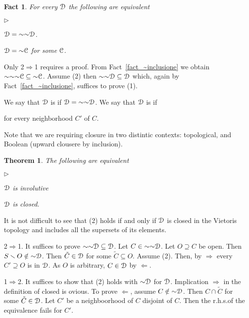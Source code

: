 \documentclass{amsproc}
\makeatletter
\newcommand{\mylabel}[1]{{#1}\hfill}
\renewenvironment{itemize}
  {\begin{list}{$\triangleright$}{%
  \setlength{\parskip}{0mm}
  \setlength{\topsep}{.1\baselineskip}
  \setlength{\rightmargin}{0mm}
  \setlength{\listparindent}{0mm}
  \setlength{\itemindent}{0mm}
  \setlength{\labelwidth}{3ex}
  \setlength{\itemsep}{.1\baselineskip}
  \setlength{\parsep}{.1\baselineskip}
  \setlength{\partopsep}{0mm}
  \setlength{\labelsep}{1ex}
  \setlength{\leftmargin}{\labelwidth+\labelsep}
  \let\makelabel\mylabel}}{%
\end{list}}
\newcounter{thm}
\theoremstyle{mio}
\newtheorem{theorem}[thm]{Theorem}\tcolorboxenvironment{theorem}{mythm}
\newtheorem{fact}[thm]{Fact}\tcolorboxenvironment{fact}{mythm}
\providecommand{\proofNameStyle}{\bfseries}
\renewenvironment{proof}[1][\proofname]{\par
  \pushQED{\qed}%
  \normalfont%
  \trivlist
  \item[\hskip\labelsep
        \proofNameStyle
    #1\@addpunct{.}]\ignorespaces
}{%
  \popQED\endtrivlist\@endpefalse
}
\renewcommand*{\emph}[1]{%
   \smash{\tikz[baseline]\node[rectangle, fill=teal!25, rounded corners, inner xsep=0.5ex, inner ysep=0.2ex, anchor=base, minimum height = 2.7ex]{\strut #1};}}
\makeatother
\begin{document}
\begin{fact}
  For every ${\EuScript D}$ the following are equivalent
  \begin{itemize}
    \item [1.] ${\EuScript D}={\sim}{\sim}{\EuScript D}$.
    \item [2.] ${\EuScript D}={\sim}{\EuScript C}$ for some ${\EuScript C}$.
  \end{itemize}
\end{fact}
  
\begin{proof}
  Only 2$\Rightarrow$1 requires a proof.
  From Fact~\ref{fact_~inclusione} we obtain ${\sim}{\sim}{\sim}{\EuScript C}\subseteq{\sim}{\EuScript C}$.
  Assume (2) then ${\sim}{\sim}{\EuScript D}\subseteq{\EuScript D}$ which, again by Fact~\ref{fact_~inclusione}, suffices to prove (1).
\end{proof}

We say that ${\EuScript D}$ is \emph{involutive\/} if ${\EuScript D}={\sim}{\sim}{\EuScript D}$.
We say that ${\EuScript D}$ is \emph{closed\/} if 

 for every neighborhood $C'$ of $C$.

Note that we are requiring closure in two distintic contexts: topological, and Boolean (upward clousere by inclusion).

\begin{theorem}
  The following are equivalent
  \begin{itemize}
    \item [1.] ${\EuScript D}$ is involutive 
    \item [2.] ${\EuScript D}$ is closed.
  \end{itemize}
\end{theorem}

\noindent\llap{\textcolor{red}{\Large\warning}\kern1.5ex}\ignorespaces
It is not difficult to see that (2) holds if and only if ${\EuScript D}$ is closed in the Vietoris topology and includes all the supersets of its elements.

\begin{proof}
  2$\Rightarrow$1.
  It suffices to prove ${\sim}{\sim}{\EuScript D}\subseteq{\EuScript D}$.
  Let $C\in{\sim}{\sim}{\EuScript D}$.
  Let $O\supseteq C$ be open.
  Then $S\smallsetminus O\notin{\sim}{\EuScript D}$.
  Then $\tilde C\in{\EuScript D}$ for some $\tilde C\subseteq O$.
  Assume (2).
  Then, by $\Rightarrow$ every $C'\supseteq O$ is in ${\EuScript D}$.
  As $O$ is arbitrary, $C\in {\EuScript D}$ by $\Leftarrow$.

  1$\Rightarrow$2.
  It suffices to show that (2) holds with ${\sim}{\EuScript D}$ for ${\EuScript D}$.
  Implication $\Rightarrow$ in the definition of closed is ovious.
  To prove $\Leftarrow$, assume $C\notin{\sim}{\EuScript D}$.
  Then $C\cap\tilde C$ for some $\tilde C\in{\EuScript D}$.
  Let $C'$ be a neighboorhood of $C$ disjoint of $C$.
  Then the r.h.s.\@ of the equivalence fails for $C'$.  
\end{proof}
\end{document}
